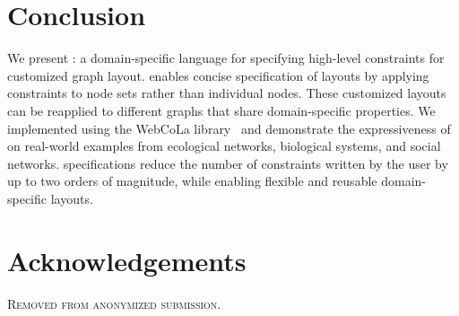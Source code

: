 \section{Conclusion}
We present \projectname: a domain-specific language for specifying high-level
constraints for customized graph layout. \projectname enables concise 
specification of layouts by applying constraints to node sets
rather than individual nodes. These customized layouts can
be reapplied to different graphs that share domain-specific properties.
We implemented \projectname using the WebCoLa library~\cite{WebCoLa} and demonstrate the expressiveness
of \projectname on real-world examples from ecological networks,
biological systems, and social networks. \projectname specifications reduce the
number of constraints written by the user by up to two orders of magnitude,
while enabling flexible and reusable domain-specific layouts.

\section*{Acknowledgements}
\textsc{Removed from anonymized submission.}

